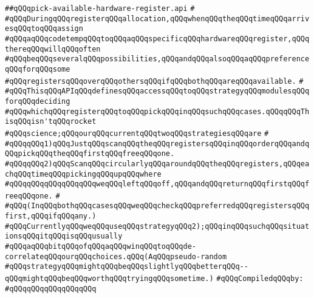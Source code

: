 \label{src/lib/compiler/back/low/regor/pick-available-hardware-register.api}
\verb|##qQQqpick-available-hardware-register.api|\newline
\verb|#|\newline
\verb|#qQQqDuringqQQqregisterqQQqallocation,qQQqwhenqQQqtheqQQqtimeqQQqarrivesqQQqtoqQQqassign|\newline
\verb|#qQQqaqQQqcodetempqQQqtoqQQqaqQQqspecificqQQqhardwareqQQqregister,qQQqthereqQQqwillqQQqoften|\newline
\verb|#qQQqbeqQQqseveralqQQqpossibilities,qQQqandqQQqalsoqQQqaqQQqpreferenceqQQqforqQQqsome|\newline
\verb|#qQQqregistersqQQqoverqQQqothersqQQqifqQQqbothqQQqareqQQqavailable.|\newline
\verb|#|\newline
\verb|#qQQqThisqQQqAPIqQQqdefinesqQQqaccessqQQqtoqQQqstrategyqQQqmodulesqQQqforqQQqdeciding|\newline
\verb|#qQQqwhichqQQqregisterqQQqtoqQQqpickqQQqinqQQqsuchqQQqcases.qQQqqQQqThisqQQqisn'tqQQqrocket|\newline
\verb|#qQQqscience;qQQqourqQQqcurrentqQQqtwoqQQqstrategiesqQQqare|\newline
\verb|#|\newline
\verb|#qQQqqQQq1)qQQqJustqQQqscanqQQqtheqQQqregistersqQQqinqQQqorderqQQqandqQQqpickqQQqtheqQQqfirstqQQqfreeqQQqone.|\newline
\verb|#qQQqqQQq2)qQQqScanqQQqcircularlyqQQqaroundqQQqtheqQQqregisters,qQQqeachqQQqtimeqQQqpickingqQQqupqQQqwhere|\newline
\verb|#qQQqqQQqqQQqqQQqqQQqweqQQqleftqQQqoff,qQQqandqQQqreturnqQQqfirstqQQqfreeqQQqone.|\newline
\verb|#|\newline
\verb|#qQQq(InqQQqbothqQQqcasesqQQqweqQQqcheckqQQqpreferredqQQqregistersqQQqfirst,qQQqifqQQqany.)|\newline
\verb|#qQQqCurrentlyqQQqweqQQquseqQQqstrategyqQQq2);qQQqinqQQqsuchqQQqsituationsqQQqitqQQqisqQQqusually|\newline
\verb|#qQQqaqQQqbitqQQqofqQQqaqQQqwinqQQqtoqQQqde-correlateqQQqourqQQqchoices.qQQq(AqQQqpseudo-random|\newline
\verb|#qQQqstrategyqQQqmightqQQqbeqQQqslightlyqQQqbetterqQQq--qQQqmightqQQqbeqQQqworthqQQqtryingqQQqsometime.)|\newline
\newline
\verb|#qQQqCompiledqQQqby:|\newline
\verb|#qQQqqQQqqQQqqQQqqQQq|\newline

